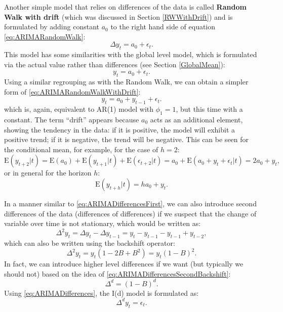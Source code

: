 \documentclass[]{book}
\theoremstyle{definition}
\theoremstyle{definition}
\theoremstyle{definition}
\theoremstyle{definition}
\theoremstyle{remark}
\begin{document}
Another simple model that relies on differences of the data is called \textbf{Random Walk with drift} (which was discussed in Section \ref{RWWithDrift}) and is formulated by adding constant \(a_0\) to the right hand side of equation \eqref{eq:ARIMARandomWalk}:
\begin{equation}
  \Delta y_t = a_0 + \epsilon_t.
  \label{eq:ARIMARandomWalkWithDrift}
\end{equation}
This model has some similarities with the global level model, which is formulated via the actual value rather than differences (see Section \ref{GlobalMean}):
\begin{equation}
  {y}_{t} = a_0 + \epsilon_t.
  \label{eq:ARIMAGlobalMean}
\end{equation}
Using a similar regrouping as with the Random Walk, we can obtain a simpler form of \eqref{eq:ARIMARandomWalkWithDrift}:
\begin{equation}
  y_t = a_0 + y_{t-1} + \epsilon_t.
  \label{eq:ARIMARandomWalkWithDrift02}
\end{equation}
which is, again, equivalent to AR(1) model with \(\phi_1=1\), but this time with a constant. The term ``drift'' appears because \(a_0\) acts as an additional element, showing the tendency in the data: if it is positive, the model will exhibit a positive trend; if it is negative, the trend will be negative. This can be seen for the conditional mean, for example, for the case of \(h=2\):
\begin{equation}
  \mathrm{E}(y_{t+2}|t) = \mathrm{E}(a_0) + \mathrm{E}(y_{t+1}|t) + \mathrm{E}(\epsilon_{t+2}|t) = a_0 + \mathrm{E}(a_0 + y_t + \epsilon_t|t) = 2 a_0 + y_t ,
  \label{eq:ARIMARandomWalkWithDriftForecasth2}
\end{equation}
or in general for the horizon \(h\):
\begin{equation}
  \mathrm{E}(y_{t+h}|t) = h a_0 + y_t .
  \label{eq:ARIMARandomWalkWithDriftForecasth}
\end{equation}

In a manner similar to \eqref{eq:ARIMADifferencesFirst}, we can also introduce second differences of the data (differences of differences) if we suspect that the change of variable over time is not stationary, which would be written as:
\begin{equation}
  \Delta^2 y_t = \Delta y_t -\Delta y_{t-1} = y_t -y_{t-1} -y_{t-1} + y_{t-2},
  \label{eq:ARIMADifferencesSecond}
\end{equation}
which can also be written using the backshift operator:
\begin{equation}
  \Delta^2 y_t = y_t(1 -2B + B^2) = y_t (1 -B)^2.
  \label{eq:ARIMADifferencesSecondBackshift}
\end{equation}
In fact, we can introduce higher level differences if we want (but typically we should not) based on the idea of \eqref{eq:ARIMADifferencesSecondBackshift}:
\begin{equation}
  \Delta^d = (1-B)^d.
  \label{eq:ARIMADifferences}
\end{equation}
Using \eqref{eq:ARIMADifferences}, the I(d) model is formulated as:
\begin{equation}
  \Delta^d y_t = \epsilon_t.
  \label{eq:ARIMA0d0}
\end{equation}
\end{document}
